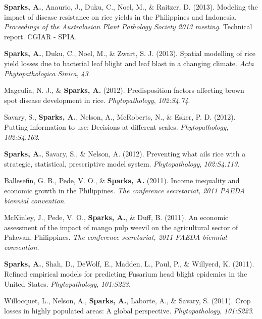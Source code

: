 \documentclass[11pt, a4paper]{awesome-cv}
\begin{document}
\leavevmode\hypertarget{ref-Sparks2013}{}%
\textbf{Sparks, A.}, Anaurio, J., Duku, C., Noel, M., \& Raitzer, D.
(2013). Modeling the impact of disease resistance on rice yields in the
{Philippines} and {Indonesia}. \emph{Proceedings of the {Australasian
Plant Pathology Society} 2013 meeting}. Technical report. CGIAR - SPIA.

\leavevmode\hypertarget{ref-Sparks2013a}{}%
\textbf{Sparks, A.}, Duku, C., Noel, M., \& Zwart, S. J. (2013). Spatial
modelling of rice yield losses due to bacterial leaf blight and leaf
blast in a changing climate. \emph{{Acta Phytopathologica Sinica}},
\emph{43}.

\leavevmode\hypertarget{ref-Magculia2012}{}%
Magculia, N. J., \& \textbf{Sparks, A.} (2012). Predisposition factors
affecting brown spot disease development in rice. \emph{Phytopathology},
\emph{102:S4.74}.

\leavevmode\hypertarget{ref-Savary2012}{}%
Savary, S., \textbf{Sparks, A.}, Nelson, A., McRoberts, N., \& Esker, P.
D. (2012). Putting information to use: {Decisions} at different scales.
\emph{Phytopathology}, \emph{102:S4.162}.

\leavevmode\hypertarget{ref-Sparks2012}{}%
\textbf{Sparks, A.}, Savary, S., \& Nelson, A. (2012). Preventing what
ails rice with a strategic, statistical, prescriptive model system.
\emph{Phytopathology}, \emph{102:S4.113}.

\leavevmode\hypertarget{ref-Ballesefin2011}{}%
Ballesefin, G. B., Pede, V. O., \& \textbf{Sparks, A.} (2011). Income
inequality and economic growth in the {Philippines}. \emph{The
conference secretariat, 2011 {PAEDA} biennial convention}.

\leavevmode\hypertarget{ref-McKinley2011}{}%
McKinley, J., Pede, V. O., \textbf{Sparks, A.}, \& Duff, B. (2011). An
economic assessment of the impact of mango pulp weevil on the
agricultural sector of {Palawan, Philippines}. \emph{The conference
secretariat, 2011 {PAEDA} biennial convention}.

\leavevmode\hypertarget{ref-Sparks2011a}{}%
\textbf{Sparks, A.}, Shah, D., DeWolf, E., Madden, L., Paul, P., \&
Willyerd, K. (2011). Refined empirical models for predicting {Fusarium}
head blight epidemics in the {United States}. \emph{Phytopathology},
\emph{101:S223}.

\leavevmode\hypertarget{ref-Willocquet2011}{}%
Willocquet, L., Nelson, A., \textbf{Sparks, A.}, Laborte, A., \& Savary,
S. (2011). Crop losses in highly populated areas: {A} global
perspective. \emph{Phytopathology}, \emph{101:S223}.
\end{document}
